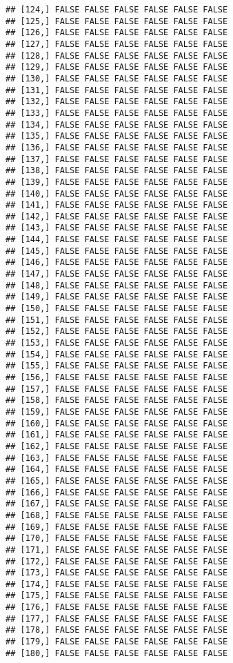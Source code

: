 \documentclass[
]{article}
\begin{document}
\begin{verbatim}
## [124,] FALSE FALSE FALSE FALSE FALSE FALSE
## [125,] FALSE FALSE FALSE FALSE FALSE FALSE
## [126,] FALSE FALSE FALSE FALSE FALSE FALSE
## [127,] FALSE FALSE FALSE FALSE FALSE FALSE
## [128,] FALSE FALSE FALSE FALSE FALSE FALSE
## [129,] FALSE FALSE FALSE FALSE FALSE FALSE
## [130,] FALSE FALSE FALSE FALSE FALSE FALSE
## [131,] FALSE FALSE FALSE FALSE FALSE FALSE
## [132,] FALSE FALSE FALSE FALSE FALSE FALSE
## [133,] FALSE FALSE FALSE FALSE FALSE FALSE
## [134,] FALSE FALSE FALSE FALSE FALSE FALSE
## [135,] FALSE FALSE FALSE FALSE FALSE FALSE
## [136,] FALSE FALSE FALSE FALSE FALSE FALSE
## [137,] FALSE FALSE FALSE FALSE FALSE FALSE
## [138,] FALSE FALSE FALSE FALSE FALSE FALSE
## [139,] FALSE FALSE FALSE FALSE FALSE FALSE
## [140,] FALSE FALSE FALSE FALSE FALSE FALSE
## [141,] FALSE FALSE FALSE FALSE FALSE FALSE
## [142,] FALSE FALSE FALSE FALSE FALSE FALSE
## [143,] FALSE FALSE FALSE FALSE FALSE FALSE
## [144,] FALSE FALSE FALSE FALSE FALSE FALSE
## [145,] FALSE FALSE FALSE FALSE FALSE FALSE
## [146,] FALSE FALSE FALSE FALSE FALSE FALSE
## [147,] FALSE FALSE FALSE FALSE FALSE FALSE
## [148,] FALSE FALSE FALSE FALSE FALSE FALSE
## [149,] FALSE FALSE FALSE FALSE FALSE FALSE
## [150,] FALSE FALSE FALSE FALSE FALSE FALSE
## [151,] FALSE FALSE FALSE FALSE FALSE FALSE
## [152,] FALSE FALSE FALSE FALSE FALSE FALSE
## [153,] FALSE FALSE FALSE FALSE FALSE FALSE
## [154,] FALSE FALSE FALSE FALSE FALSE FALSE
## [155,] FALSE FALSE FALSE FALSE FALSE FALSE
## [156,] FALSE FALSE FALSE FALSE FALSE FALSE
## [157,] FALSE FALSE FALSE FALSE FALSE FALSE
## [158,] FALSE FALSE FALSE FALSE FALSE FALSE
## [159,] FALSE FALSE FALSE FALSE FALSE FALSE
## [160,] FALSE FALSE FALSE FALSE FALSE FALSE
## [161,] FALSE FALSE FALSE FALSE FALSE FALSE
## [162,] FALSE FALSE FALSE FALSE FALSE FALSE
## [163,] FALSE FALSE FALSE FALSE FALSE FALSE
## [164,] FALSE FALSE FALSE FALSE FALSE FALSE
## [165,] FALSE FALSE FALSE FALSE FALSE FALSE
## [166,] FALSE FALSE FALSE FALSE FALSE FALSE
## [167,] FALSE FALSE FALSE FALSE FALSE FALSE
## [168,] FALSE FALSE FALSE FALSE FALSE FALSE
## [169,] FALSE FALSE FALSE FALSE FALSE FALSE
## [170,] FALSE FALSE FALSE FALSE FALSE FALSE
## [171,] FALSE FALSE FALSE FALSE FALSE FALSE
## [172,] FALSE FALSE FALSE FALSE FALSE FALSE
## [173,] FALSE FALSE FALSE FALSE FALSE FALSE
## [174,] FALSE FALSE FALSE FALSE FALSE FALSE
## [175,] FALSE FALSE FALSE FALSE FALSE FALSE
## [176,] FALSE FALSE FALSE FALSE FALSE FALSE
## [177,] FALSE FALSE FALSE FALSE FALSE FALSE
## [178,] FALSE FALSE FALSE FALSE FALSE FALSE
## [179,] FALSE FALSE FALSE FALSE FALSE FALSE
## [180,] FALSE FALSE FALSE FALSE FALSE FALSE

\end{verbatim}
\end{document}
